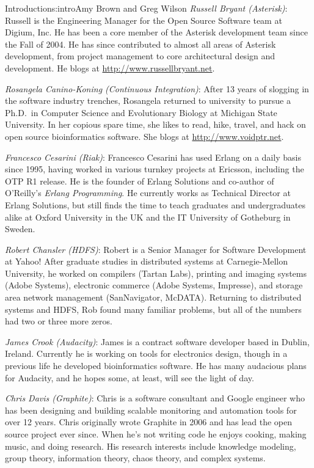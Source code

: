 \begin{aosachapter}{Introduction}{s:intro}{Amy Brown and Greg Wilson}
\emph{Russell Bryant (Asterisk)}: Russell is the Engineering
Manager for the Open Source Software team at Digium, Inc. He has
been a core member of the Asterisk development team since the Fall
of 2004. He has since contributed to almost all areas of Asterisk
development, from project management to core architectural design
and development.  He blogs at
\url{http://www.russellbryant.net}.

\emph{Rosangela Canino-Koning (Continuous Integration)}:
After 13 years of slogging in the software industry trenches,
Rosangela returned to university to pursue a Ph.D.\ in Computer
Science and Evolutionary Biology at Michigan State University. In
her copious spare time, she likes to read, hike, travel, and hack
on open source bioinformatics software.  She blogs at
\url{http://www.voidptr.net}.

\emph{Francesco Cesarini (Riak)}: Francesco Cesarini has
used Erlang on a daily basis since 1995, having worked in various
turnkey projects at Ericsson, including the OTP R1 release. He is
the founder of Erlang Solutions and co-author of
O'Reilly's \emph{Erlang Programming}. He currently works as
Technical Director at Erlang Solutions, but still finds the time
to teach graduates and undergraduates alike at Oxford University in
the UK and the IT University of Gotheburg in Sweden.

\emph{Robert Chansler (HDFS)}: Robert is a Senior Manager for Software
Development at Yahoo!  After graduate studies in distributed systems
at Carnegie-Mellon University, he worked on compilers (Tartan Labs),
printing and imaging systems (Adobe Systems), electronic commerce
(Adobe Systems, Impresse), and storage area network management
(SanNavigator, McDATA). Returning to distributed systems and HDFS, Rob
found many familiar problems, but all of the numbers had two or three
more zeros.

\emph{James Crook (Audacity)}: James is a contract software
developer based in Dublin, Ireland. Currently he is working on
tools for electronics design, though in a previous life he
developed bioinformatics software.  He has many audacious plans
for Audacity, and he hopes some, at least, will see the light of day.

\pagebreak

\emph{Chris Davis (Graphite)}: Chris is a software
consultant and Google engineer who has been designing and building
scalable monitoring and automation tools for over 12 years. Chris
originally wrote Graphite in 2006 and has lead the open source
project ever since. When he's not writing code he enjoys cooking,
making music, and doing research. His research interests include
knowledge modeling, group theory, information theory, chaos
theory, and complex systems.


\end{aosachapter}
